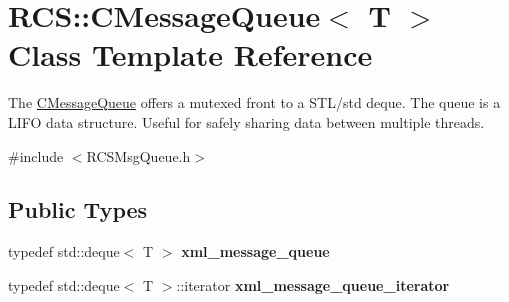 \hypertarget{class_r_c_s_1_1_c_message_queue}{}\section{R\+C\+S\+:\+:C\+Message\+Queue$<$ T $>$ Class Template Reference}
\label{class_r_c_s_1_1_c_message_queue}


The \hyperlink{class_r_c_s_1_1_c_message_queue}{C\+Message\+Queue} offers a mutexed front to a S\+T\+L/std deque. The queue is a L\+I\+F\+O data structure. Useful for safely sharing data between multiple threads.  




{\ttfamily \#include $<$R\+C\+S\+Msg\+Queue.\+h$>$}

\subsection*{Public Types}
\begin{DoxyCompactItemize}
\item 
\hypertarget{class_r_c_s_1_1_c_message_queue_a272ec6240c0ae616f66e71a033326e28}{}typedef std\+::deque$<$ T $>$ {\bfseries xml\+\_\+message\+\_\+queue}\label{class_r_c_s_1_1_c_message_queue_a272ec6240c0ae616f66e71a033326e28}

\item 
\hypertarget{class_r_c_s_1_1_c_message_queue_aa229add119e43aa53229252b6dffb691}{}typedef std\+::deque$<$ T $>$\+::iterator {\bfseries xml\+\_\+message\+\_\+queue\+\_\+iterator}\label{class_r_c_s_1_1_c_message_queue_aa229add119e43aa53229252b6dffb691}

\end{DoxyCompactItemize}
